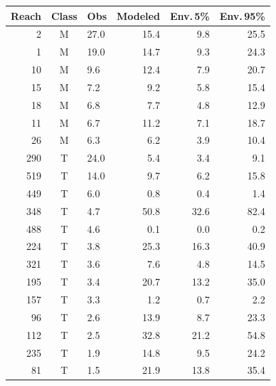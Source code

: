 \begin{tabular}{rclrrr}
\hline
Reach & Class & Obs & Modeled & Env.\,5\% & Env.\,95\% \\
\hline
2 & M & 27.0 & 15.4 & 9.8 & 25.5 \\
1 & M & 19.0 & 14.7 & 9.3 & 24.3 \\
10 & M & 9.6 & 12.4 & 7.9 & 20.7 \\
15 & M & 7.2 & 9.2 & 5.8 & 15.4 \\
18 & M & 6.8 & 7.7 & 4.8 & 12.9 \\
11 & M & 6.7 & 11.2 & 7.1 & 18.7 \\
26 & M & 6.3 & 6.2 & 3.9 & 10.4 \\
290 & T & 24.0 & 5.4 & 3.4 & 9.1 \\
519 & T & 14.0 & 9.7 & 6.2 & 15.8 \\
449 & T & 6.0 & 0.8 & 0.4 & 1.4 \\
348 & T & 4.7 & 50.8 & 32.6 & 82.4 \\
488 & T & 4.6 & 0.1 & 0.0 & 0.2 \\
224 & T & 3.8 & 25.3 & 16.3 & 40.9 \\
321 & T & 3.6 & 7.6 & 4.8 & 14.5 \\
195 & T & 3.4 & 20.7 & 13.2 & 35.0 \\
157 & T & 3.3 & 1.2 & 0.7 & 2.2 \\
96 & T & 2.6 & 13.9 & 8.7 & 23.3 \\
112 & T & 2.5 & 32.8 & 21.2 & 54.8 \\
235 & T & 1.9 & 14.8 & 9.5 & 24.2 \\
81 & T & 1.5 & 21.9 & 13.8 & 35.4 \\
\hline
\end{tabular}
